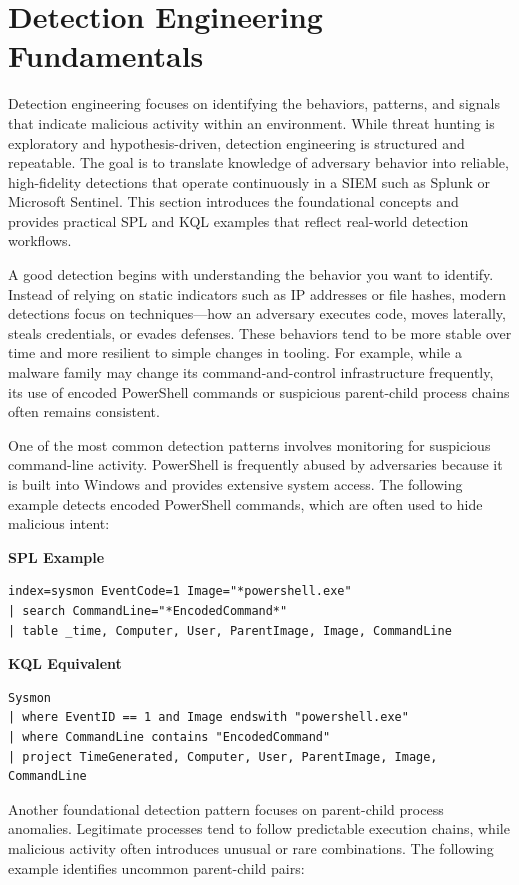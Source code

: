 \section{Detection Engineering Fundamentals}

Detection engineering focuses on identifying the behaviors, patterns, and signals that indicate malicious activity within an environment. While threat hunting is exploratory and hypothesis-driven, detection engineering is structured and repeatable. The goal is to translate knowledge of adversary behavior into reliable, high-fidelity detections that operate continuously in a SIEM such as Splunk or Microsoft Sentinel. This section introduces the foundational concepts and provides practical SPL and KQL examples that reflect real-world detection workflows.

A good detection begins with understanding the behavior you want to identify. Instead of relying on static indicators such as IP addresses or file hashes, modern detections focus on techniques—how an adversary executes code, moves laterally, steals credentials, or evades defenses. These behaviors tend to be more stable over time and more resilient to simple changes in tooling. For example, while a malware family may change its command-and-control infrastructure frequently, its use of encoded PowerShell commands or suspicious parent-child process chains often remains consistent.

One of the most common detection patterns involves monitoring for suspicious command-line activity. PowerShell is frequently abused by adversaries because it is built into Windows and provides extensive system access. The following example detects encoded PowerShell commands, which are often used to hide malicious intent:

\textbf{SPL Example}
\begin{lstlisting}
index=sysmon EventCode=1 Image="*powershell.exe"
| search CommandLine="*EncodedCommand*"
| table _time, Computer, User, ParentImage, Image, CommandLine
\end{lstlisting}

\textbf{KQL Equivalent}
\begin{lstlisting}
Sysmon
| where EventID == 1 and Image endswith "powershell.exe"
| where CommandLine contains "EncodedCommand"
| project TimeGenerated, Computer, User, ParentImage, Image, CommandLine
\end{lstlisting}

Another foundational detection pattern focuses on parent-child process anomalies. Legitimate processes tend to follow predictable execution chains, while malicious activity often introduces unusual or rare combinations. The following example identifies uncommon parent-child pairs:

